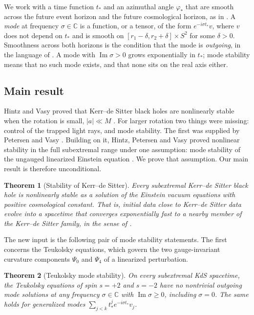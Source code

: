 \documentclass[11pt]{amsart}
\newtheorem{theorem}{Theorem}[section]
\theoremstyle{definition}
\theoremstyle{remark}
\numberwithin{equation}{section}
\newcommand{\C}{\mathbb{C}}
\renewcommand{\Im}{\operatorname{Im}}
\begin{document}
We work with a time function $t_*$ and an azimuthal angle $\varphi_*$ that are smooth across the future event
horizon and the future cosmological horizon, as in \cite{HPV25,Hin26}. A \emph{mode} at frequency $\sigma\in\C$ is a
function, or a tensor, of the form $e^{-i\sigma t_*}v$, where $v$ does not depend on $t_*$ and is smooth on
$[r_1-\delta,r_2+\delta]\times S^2$ for some $\delta>0$. Smoothness across both horizons is the condition that
the mode is \emph{outgoing}, in the language of \cite{Hin26}. A mode with $\Im\sigma>0$ grows exponentially in $t_*$;
mode stability means that no such mode exists, and that none sits on the real axis either.

\subsection{Main result}
Hintz and Vasy proved that Kerr--de Sitter black holes are nonlinearly stable when the rotation is small,
$|a|\ll M$ \cite{HV18}. For larger rotation two things were missing: control of the trapped light rays, and mode
stability. The first was supplied by Petersen and Vasy \cite{PV24,PV25}. Building on it, Hintz, Petersen and Vasy
proved nonlinear stability in the full subextremal range under one assumption: mode stability of the ungauged
linearized Einstein equation \cite[Assumption~1.2]{HPV25}. We prove that assumption. Our main result is therefore
unconditional.

\begin{theorem}[Stability of Kerr--de Sitter]\label{thm:C}
Every subextremal Kerr--de Sitter black hole is nonlinearly stable as a solution of the Einstein vacuum equations with
positive cosmological constant. That is, initial data close to Kerr--de Sitter data evolve into a spacetime that
converges exponentially fast to a nearby member of the Kerr--de Sitter family, in the sense of
\cite[Theorem~1.4]{HPV25}.
\end{theorem}

The new input is the following pair of mode stability statements. The first concerns the Teukolsky equations, which
govern the two gauge-invariant curvature components $\Psi_0$ and $\Psi_4$ of a linearized perturbation.

\begin{theorem}[Teukolsky mode stability]\label{thm:A}
On every subextremal KdS spacetime, the Teukolsky equations of spin $s=+2$ and $s=-2$ have no nontrivial outgoing
mode solutions at any frequency $\sigma\in\C$ with $\Im\sigma\ge0$, including $\sigma=0$. The same holds for
generalized modes $\sum_{j<k}t_*^je^{-i\sigma t_*}v_j$.
\end{theorem}
\end{document}
